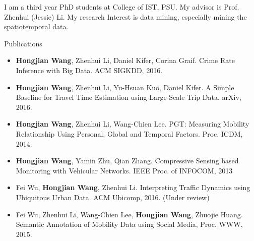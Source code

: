 
I am a third year PhD students at College of IST, PSU. My advisor is Prof. Zhenhui (Jessie) Li. My research Interest is data mining, especially mining the spatiotemporal data.




\vspace{3cm}

\centerline{Publications}

\begin{itemize}
\item \textbf{Hongjian Wang}, Zhenhui Li, Daniel Kifer, Corina Graif. Crime Rate Inference with Big Data. ACM SIGKDD, 2016.
\item \textbf{Hongjian Wang}, Zhenhui Li, Yu-Hsuan Kuo, Daniel Kifer. A Simple Baseline for Travel Time Estimation using Large-Scale Trip Data. arXiv, 2016.
\item \textbf{Hongjian Wang}, Zhenhui Li, Wang-Chien Lee. PGT: Measuring Mobility Relationship Using Personal, Global and Temporal Factors. Proc. ICDM, 2014.
\item \textbf{Hongjian Wang}, Yamin Zhu, Qian Zhang. Compressive Sensing based Monitoring with Vehicular Networks. IEEE Proc. of INFOCOM, 2013
\item Fei Wu, \textbf{Hongjian Wang}, Zhenhui Li. Interpreting Traffic Dynamics using Ubiquitous Urban Data. ACM Ubicomp, 2016. (Under review)
\item Fei Wu, Zhenhui Li, Wang-Chien Lee, \textbf{Hongjian Wang}, Zhuojie Huang. Semantic Annotation of Mobility Data using Social Media, Proc. WWW, 2015.
\end{itemize}

